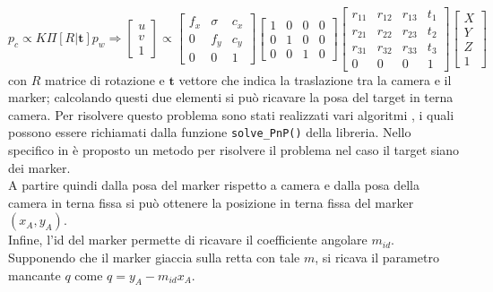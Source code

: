     \begin{equation}
    p_c \propto K \Pi [R | \boldsymbol{t}] p_w  \Rightarrow
     \begin{bmatrix}
           u \\
           v \\
           1
        \end{bmatrix}
         \propto 
         \begin{bmatrix}
           f_x & \sigma & c_x \\
           0 & f_y & c_y \\
           0 & 0 & 1 
         \end{bmatrix}
          \begin{bmatrix}
           1 & 0 & 0 & 0 \\
           0 & 1 & 0 & 0 \\
           0 & 0 & 1 & 0
         \end{bmatrix}
         \begin{bmatrix}
           r_{11} & r_{12} & r_{13} & t_1 \\
           r_{21} & r_{22} & r_{23} & t_2 \\
           r_{31} & r_{32} & r_{33} & t_3 \\
           0 & 0 & 0 & 1
         \end{bmatrix}
         \begin{bmatrix}
           X \\
           Y \\
           Z \\
           1
    \end{bmatrix}
  \end{equation}
  con $R$ matrice di rotazione e $ \boldsymbol{t}$ vettore che indica la traslazione tra la camera e il marker; calcolando questi due elementi si può ricavare la 
  posa del target in terna camera. Per risolvere questo problema sono stati realizzati vari algoritmi \cite{marchand2015pose}, i quali possono essere richiamati dalla funzione 
  \texttt{solve\_PnP()} della libreria. Nello specifico in \cite{infinitesimal} è proposto un metodo per risolvere il problema nel caso il target siano dei marker. \\
  A partire quindi dalla posa del marker rispetto a camera e dalla posa della camera in terna fissa si può ottenere la posizione in terna fissa del marker $(x_A, y_A)$.\\
  Infine, l'id del marker permette di ricavare il coefficiente angolare $m_{id}$. Supponendo che il marker giaccia sulla retta con tale $m$, si ricava il 
  parametro mancante $q$ come $ q = y_A - m_{id}x_A$.
